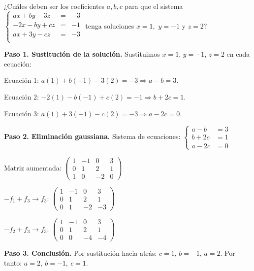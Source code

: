 \begin{prob}
¿Cuáles deben ser los coeficientes $a,b,c$ para que el sistema  $\left\lbrace \begin{array}{ccc}
ax+by-3z&=&-3\\
-2x-by+cz&=&-1\\
ax+3y-cz&=&-3\\
\end{array} \right. $ tenga soluciones $x=1,$ $y=-1$ y $z=2$?



\begin{myproof}
\textbf{Paso 1. Sustitución de la solución.} Sustituimos $x=1$, $y=-1$, $z=2$ en cada ecuación:

Ecuación 1: $a(1) + b(-1) - 3(2) = -3\Rightarrow a - b = 3.$

Ecuación 2: $-2(1) - b(-1) + c(2) = -1\Rightarrow b + 2c = 1.$

Ecuación 3: $a(1) + 3(-1) - c(2) = -3 \Rightarrow a - 2c = 0.$

\textbf{Paso 2. Eliminación gaussiana.} Sistema de ecuaciones: $\begin{cases}
a - b &= 3 \\
b + 2c &= 1 \\
a - 2c &= 0
\end{cases}$

Matriz aumentada: $\left(\begin{array}{ccc|c}
1 & -1 & 0 & 3 \\
0 & 1 & 2 & 1 \\
1 & 0 & -2 & 0
\end{array}\right)$ 

$-f_1 + f_3 \to f_3$: $\left(\begin{array}{ccc|c}
1 & -1 & 0 & 3 \\
0 & 1 & 2 & 1 \\
0 & 1 & -2 & -3
\end{array}\right)$

$-f_2 + f_3 \to f_3$: $\left(\begin{array}{ccc|c}
1 & -1 & 0 & 3 \\
0 & 1 & 2 & 1 \\
0 & 0 & -4 & -4
\end{array}\right)$

\textbf{Paso 3. Conclusión.} Por sustitución hacia atrás:
$c = 1$, $b = -1$, $a = 2$. Por tanto: $\boxed{a = 2,\ b = -1,\ c = 1}.$
\end{myproof}
\end{prob}

